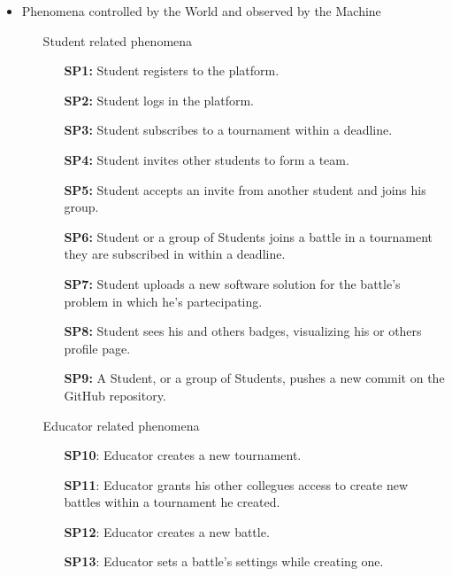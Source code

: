 \documentclass{article}
\newcounter{subsubsubsection}[subsubsection]
\begin{document}
\begin{itemize}
    \item Phenomena controlled by the World and observed by the Machine
          \begin{enumerate}
              \item[\ding{228}] Student related phenomena
                    \begin{enumerate}
                        \item[\textbf{SP1:}] Student registers to the platform.
                        \item[\textbf{SP2:}] Student logs in the platform.
                        \item[\textbf{SP3:}] Student subscribes to a tournament within a deadline.
                        \item[\textbf{SP4:}] Student invites other students to form a team.
                        \item[\textbf{SP5:}] Student accepts an invite from another student and joins his group.
                        \item[\textbf{SP6:}] Student or a group of Students joins a battle in a tournament they are subscribed in within a deadline.
                        \item[\textbf{SP7:}] Student uploads a new software solution for the battle's problem in which he's partecipating.
                        \item[\textbf{SP8:}] Student sees his and others badges, visualizing his or others profile page.
                        \item[\textbf{SP9:}] A Student, or a group of Students, pushes a new commit on the GitHub repository.
                    \end{enumerate}
              \item[\ding{228}] Educator related phenomena
                    \begin{enumerate}
                        \item[\textbf{SP10}:] Educator creates a new tournament.
                        \item[\textbf{SP11}:] Educator grants his other collegues access to create new battles within a tournament he created.
                        \item[\textbf{SP12}:] Educator creates a new battle.
                        \item[\textbf{SP13}:] Educator sets a battle's settings while creating one.

\end{enumerate}
\end{enumerate}
\end{itemize}
\end{document}
